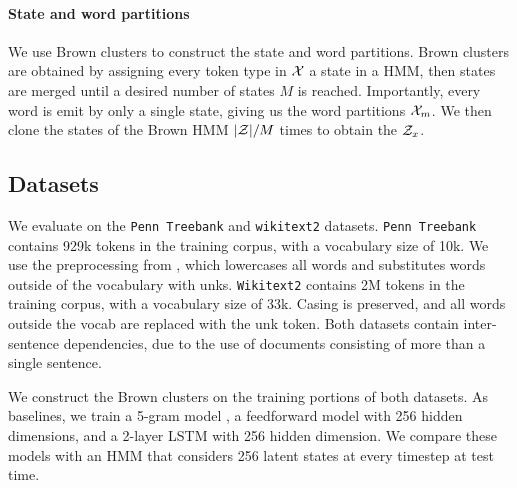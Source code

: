 \documentclass[11pt,a4paper]{article}
\begin{document}
\paragraph{State and word partitions}
We use Brown clusters \citep{brown1992,liang2005brown} to construct the state and word partitions.
Brown clusters are obtained by assigning every token type in $\mathcal{X}$ a state in a HMM,
then states are merged until a desired number of states $M$ is reached.
Importantly, every word is emit by only a single state, giving us the 
word partitions $\mathcal{X}_m$.
We then clone the states of the Brown HMM $|\mathcal{Z}|/M$ times to obtain the $\mathcal{Z}_x$.

\subsection{Datasets}
We evaluate on the \texttt{Penn Treebank} \citep{ptb}
and \texttt{wikitext2} \citep{wikitext} datasets.
\texttt{Penn Treebank} contains 929k tokens in the training corpus,
with a vocabulary size of 10k.
We use the preprocessing from \citet{mikolov-2011},
which lowercases all words and substitutes words outside of the vocabulary
with unks. 
\texttt{Wikitext2} contains 2M tokens in the training corpus,
with a vocabulary size of 33k.
Casing is preserved, and all words outside the vocab are replaced with the unk token.
Both datasets contain inter-sentence dependencies,
due to the use of documents consisting of more than a single sentence.

We construct the Brown clusters on the training portions of both datasets.
As baselines, we train a 5-gram model \citep{kenlm},
a feedforward model with 256 hidden dimensions,
and a 2-layer LSTM with 256 hidden dimension.
We compare these models with an HMM that considers 256 latent states
at every timestep at test time.

\begin{comment}
\paragraph{Implementation}
We train two-layer LSTM recurrent neural networks with 256 units,
as well as two-layer feed-forward neural networks with 256 units.
The HMMs we train follow the sparsity constraints outlined in the previous
section with a dropout rate of 0.5,
and we vary the total number of states as well as states per word.
We optimize all models with AdamW \citep{adamw}.

We experimented with a couple batching strategies:
On \texttt{Penn Treebank},
the first strategy discarded the inter-sentence dependencies and shuffled all sentences,
and the second treated the corpus as a single flat document without shuffling.
On \texttt{Wikitext2}, we either shuffled at the document level or treated the corpus as a
single document.
Prior work on both corpuses treated the corpora as single documents.

See Appendix \ref{sec:hyperparams} for the hyperparameters for all models.
\end{comment}
\end{document}

